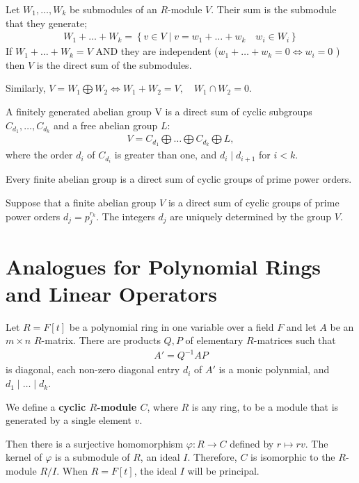 \documentclass{memoir}
\begin{document}
\begin{defn}
	Let \(W_1,\ldots,W_k\) be submodules of an \(R\)-module \(V\). Their sum is the submodule that they generate;
	\begin{align*}
		W_1 + \ldots + W_k = \left\{v \in V \mid v = w_1+\ldots+w_k \quad w_i \in W_i \right\} 
	\end{align*}
	If \(W_1 + \ldots + W_k = V\) AND they are independent (\(w_1+\ldots+w_k=0 \iff w_i = 0\) ) then \(V\) is the direct sum of the submodules.
\end{defn}
Similarly, \(V = W_1\bigoplus W_2 \iff W_1+W_2=V, \quad W_1 \cap W_2 = 0\).

\begin{thm}
	A finitely generated abelian group V is a direct sum of cyclic subgroups \(C_{d_1},\ldots,C_{d_k}\) and a free abelian group \(L\):
	\begin{align*}
		V = C_{d_1}\bigoplus \ldots \bigoplus C_{d_k}\bigoplus L,
	\end{align*}
	where the order \(d_i\) of \(C_{d_i}\) is greater than one, and \(d_i \mid d_{i+1}\) for \(i<k\).
\end{thm}

\begin{thm}
	Every finite abelian group is a direct sum of cyclic groups of prime power orders.
\end{thm}
\begin{thm}
	Suppose that a finite abelian group \(V\) is a direct sum of cyclic groups of prime power orders \(d_j = p_j^{r_k}\). The integers \(d_j\) are uniquely determined by the group \(V\).
\end{thm}

\section{Analogues for Polynomial Rings and Linear Operators}
\label{sec:analogues_for_polynomial_rings_and_linear_operators}

\begin{thm}
	Let \(R = F[t]\) be a polynomial ring in one variable over a field \(F\) and let \(A\) be an \(m\times n\) \(R\)-matrix. There are products \(Q,P\) of elementary \(R\)-matrices such that
	\begin{align*}
		A' = Q^{-1}AP
	\end{align*}
	is diagonal, each non-zero diagonal entry \(d_i\) of \(A'\) is a monic polynmial, and \(d_1\mid \ldots\mid d_k\).
\end{thm}
\begin{defn}
We define a \textbf{cyclic \(R\)-module \(C\)}, where \(R\) is any ring, to be a module that is generated by a single element \(v\).
\end{defn}
Then there is a surjective homomorphism \(\varphi:R\to C\) defined by \(r\mapsto rv\). The kernel of \(\varphi\) is a submodule of \(R\), an ideal \(I\). Therefore, \(C\) is isomorphic to the \(R\)-module \(R / I\). When \(R = F[t]\), the ideal \(I\) will be principal.
\end{document}
